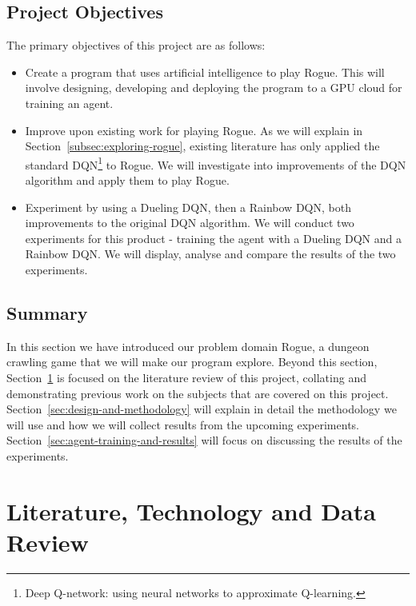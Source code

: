 \documentclass[12pt,a4paper]{article}
\begin{document}
    \subsection{Project Objectives}\label{subsec:objectives}
    The primary objectives of this project are as follows:
    \begin{itemize}
        \item Create a program that uses artificial intelligence to play Rogue.
        This will involve designing, developing and deploying the program to a GPU cloud for training an agent.
        \item Improve upon existing work for playing Rogue.
        As we will explain in Section~\ref{subsec:exploring-rogue}, existing literature has only applied the standard
        DQN\footnote{Deep Q-network: using neural networks to approximate Q-learning.} to Rogue.
        We will investigate into improvements of the DQN algorithm and apply them to play Rogue.
        \item Experiment by using a Dueling DQN, then a Rainbow DQN, both improvements to the original DQN algorithm.
        We will conduct two experiments for this product - training the agent with a Dueling DQN and a Rainbow DQN.
        We will display, analyse and compare the results of the two experiments.
    \end{itemize}

    \subsection{Summary}\label{subsec:summary1}
    In this section we have introduced our problem domain Rogue, a dungeon crawling game that we will make our program explore.
    Beyond this section, Section~\ref{sec:literature-technology-and-data-review} is focused on the literature review of
    this project, collating and demonstrating previous work on the subjects that are covered on this project.
    Section~\ref{sec:design-and-methodology} will explain in detail the methodology we will use and how we will collect
    results from the upcoming experiments.
    Section~\ref{sec:agent-training-and-results} will focus on discussing the results of the experiments.

    \section{Literature, Technology and Data Review}\label{sec:literature-technology-and-data-review}
\end{document}
